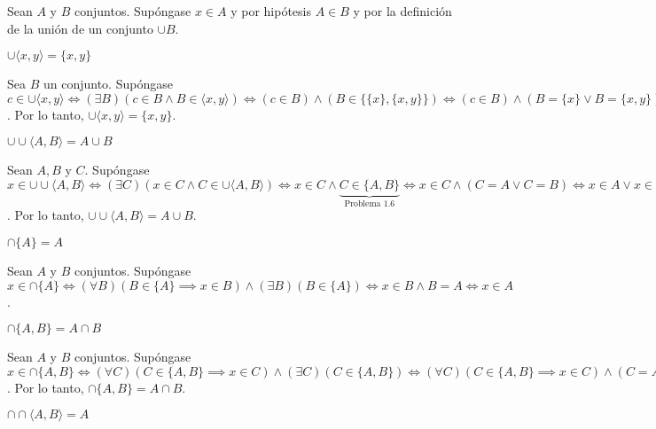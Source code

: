 \begin{dem}
	Sean $A$ y $B$ conjuntos. Supóngase $x\in A$ y por hipótesis $A\in B$ y por la definición de la unión de un conjunto $\cup B$. 
\end{dem}
\begin{problema}
	$\cup\langle x, y\rangle=\{x, y\}$
\end{problema}
\begin{dem}
	Sea $B$ un conjunto. Supóngase $c\in \cup \langle x,y\rangle \iff (\exists B)(c\in B\wedge B\in  \langle x,y\rangle)\iff (c\in B)\wedge (B\in \{\{x\},\{x,y\}\})\iff (c\in B)\wedge (B=\{x\}\vee B=\{x,y\})\iff (c\in \{x\})\wedge (x\in \{x,y\})$. Por lo tanto, $\cup\langle x, y\rangle=\{x, y\}$. 
\end{dem}
\begin{problema}
	$\cup \cup \langle A, B\rangle=A \cup B$
\end{problema}

\begin{dem}
	Sean $A,B$ y $C$. Supóngase $x\in \cup \cup \langle A,B \rangle \iff (\exists C)(x\in C\wedge C\in \cup \langle A,B\rangle )\iff x\in C\wedge \underbrace{C\in \{A,B\}}_{\text{Problema 1.6}}\iff x\in C \wedge (C=A\vee C=B)\iff x\in A\vee x\in B\iff x\in A\cup B$. Por lo tanto, $\cup \cup \langle A, B\rangle=A \cup B$.
\end{dem}
\begin{problema}
	$\cap\{A\}=A$
\end{problema}

\begin{dem}
	Sean $A$ y $B$ conjuntos. Supóngase $x\in \cap \{A\}\iff (\forall B)(B\in \{A\}\implies x\in B)\wedge (\exists B)(B\in \{A\})\iff x\in B\wedge B=A\iff x\in A$. 
\end{dem}
\begin{problema}
	 $\cap\{A, B\}=A \cap B$
\end{problema}

\begin{dem}
	Sean $A$ y $B$ conjuntos. Supóngase $x\in \cap \{A,B\}\iff (\forall C)(C\in \{A,B\}\implies x\in C)\wedge (\exists C)(C\in \{A,B\})\iff (\forall C)(C\in \{A,B\}\implies x\in C)\wedge (C=A\vee C=B)\iff x\in A \wedge x\in B\iff x\in A\cup B$. Por lo tanto, $\cap\{A, B\}=A \cap B$. 
\end{dem}
\begin{problema}
	 $\cap \cap \langle A, B\rangle=A$
\end{problema}

